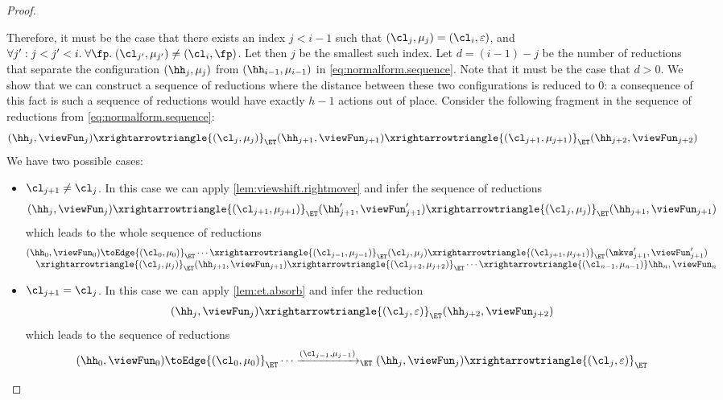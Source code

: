 \begin{proof}
\begin{enumerate}
Therefore, it must be the case that there exists an index $j < i-1$ such that $(\cl_{j}, \mu_{j}) = (\cl_{i}, \varepsilon)$, 
and $\forall j': j< j' < i.\;\forall \fp.\;(\cl_{j'}, \mu_{j'}) \neq (\cl_{i}, \fp)$. Let then $j$ be the smallest such index. 
Let $d = (i-1)-j$ be the number of reductions that separate the configuration $(\hh_{j}, \mu_{j})$ from 
$(\hh_{i-1}, \mu_{i-1})$ in \cref{eq:normalform.sequence}. Note that it must be the case that $d > 0$. We show that we can 
construct a sequence of reductions where the distance between these two configurations is reduced to $0$: 
a consequence of this fact is such a sequence of reductions would have exactly $h-1$ actions out of place.
Consider the following fragment in the sequence of reductions from \cref{eq:normalform.sequence}:
\[
(\hh_{j}, \viewFun_{j}) \xrightarrowtriangle{(\cl_{j}, \mu_{j})}_{\ET} (\hh_{j+1}, \viewFun_{j+1}) 
\xrightarrowtriangle{(\cl_{j+1}, \mu_{j+1})}_{\ET} (\hh_{j+2}, \viewFun_{j+2})
\]
We have two possible cases: 
\begin{itemize}
\item $\cl_{j+1} \neq \cl_{j}$. In this case we can apply \cref{lem:viewshift.rightmover} and infer the sequence of 
reductions 
\[
(\hh_{j}, \viewFun_{j}) \xrightarrowtriangle{(\cl_{j+1}, \mu_{j+1})}_{\ET} (\hh_{j+1}', \viewFun_{j+1}') 
\xrightarrowtriangle{(\cl_{j}, \mu_{j})}_{\ET} (\hh_{j+1}, \viewFun_{j+1})
\]
which leads to the whole sequence of reductions 
\[
\begin{array}{@{}l@{}}
(\hh_{0}, \viewFun_{0}) \toEdge{(\cl_{0}, \mu_{0})}_{\ET} \cdots 
\xrightarrowtriangle{(\cl_{j-1}, \mu_{j-1})}_{\ET} (\cl_{j}, \mu_{j}) 
\xrightarrowtriangle{(\cl_{j+1}, \mu_{j+1})}_{\ET} (\mkvs'_{j+1}, \viewFun'_{j+1})  \\
\quad \xrightarrowtriangle{(\cl_{j}, \mu_{j})}_{\ET} (\hh_{j+1}, \viewFun_{j+1})  
\xrightarrowtriangle{(\cl_{j+2}, \mu_{j+2})}_{\ET} \cdots \xrightarrowtriangle{(\cl_{n-1}, \mu_{n-1})} \hh_{n}, \viewFun_{n}
\end{array}
\]
\item $\cl_{j+1} = \cl_{j}$. In this case we can apply \cref{lem:et.absorb} and infer the reduction 
\[
(\hh_{j}, \viewFun_{j}) \xrightarrowtriangle{(\cl_{j}, \varepsilon)}_{\ET} (\hh_{j+2}, \viewFun_{j+2})
\]
which leads to the sequence of reductions 
\[
\begin{array}{@{}l@{}}
(\hh_{0}, \viewFun_{0}) \toEdge{(\cl_{0}, \mu_{0})}_{\ET} \cdots 
\xrightarrow{(\cl_{j-1}, \mu_{j-1})}_{\ET} (\hh_{j}, \viewFun_{j}) \xrightarrowtriangle{(\cl_{j}, \varepsilon)}_{\ET}  \\

\end{array}\]
\end{itemize}
\end{enumerate}
\end{proof}
